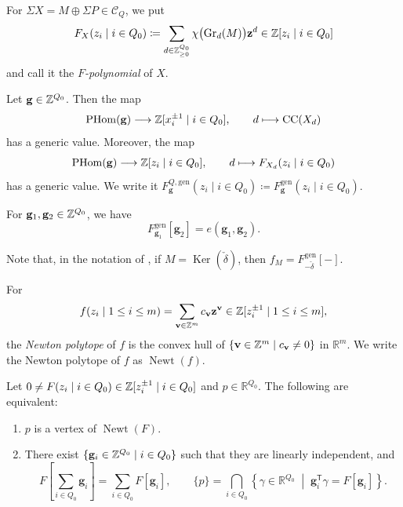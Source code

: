 For $\Sigma X = M \oplus \Sigma P \in \mathcal{C}_Q$, we put
\[
F_X(z_i \mid i \in Q_0)
\coloneq
\sum_{d \in \mathbb{Z}_{\geq 0}^{Q_0}}
\chi\bigl(\operatorname{Gr}_d(M)\bigr)\mathbf{z}^d
\in \mathbb{Z}[z_i \mid i \in Q_0]
\]
and call it the \emph{$F$-polynomial} of $X$.

\begin{Prop}
\label{Prop : generic cluster characters and F polynomials}
Let $\mathbf{g} \in \mathbb{Z}^{Q_0}$.
Then the map
\[
\operatorname{PHom}(\mathbf{g})
\longrightarrow \mathbb{Z}[x_i^{\pm 1} \mid i \in Q_0],
\qquad d \longmapsto \mathrm{CC}(X_d)
\]
has a generic value.
Moreover, the map
\[
\operatorname{PHom}(\mathbf{g})
\longrightarrow \mathbb{Z}[z_i \mid i \in Q_0],
\qquad d \longmapsto F_{X_d}(z_i \mid i \in Q_0)
\]
has a generic value.
We write it
$F_{\mathbf{g}}^{Q,\mathrm{gen}}(z_i \mid i \in Q_0)
\coloneq F_{\mathbf{g}}^{\mathrm{gen}}(z_i \mid i \in Q_0)$.
\end{Prop}

\begin{Prop}
\label{Prop : generic tropical F polynomials and E invariants}
For $\mathbf{g}_1, \mathbf{g}_2 \in \mathbb{Z}^{Q_0}$, we have
\[
F_{\mathbf{g}_1}^{\mathrm{gen}}[\mathbf{g}_2] = e(\mathbf{g}_1, \mathbf{g}_2).
\]
\end{Prop}

\begin{Rem}
\label{Rem : comparison with Fei notation}
Note that, in the notation of \cite{Fei23},
if $M = \operatorname{Ker}(\check{\delta})$, then
$f_M = F_{-\check{\delta}}^{\mathrm{gen}}[-]$.
\end{Rem}

\begin{Def}
\label{Def : Newton polytope}
For
\[
f(z_i \mid 1 \leq i \leq m)
= \sum_{\mathbf{v} \in \mathbb{Z}^m}c_{\mathbf{v}}\mathbf{z}^{\mathbf{v}}
\in \mathbb{Z}[z_i^{\pm 1} \mid 1 \leq i \leq m],
\]
the \emph{Newton polytope} of $f$ is the convex hull of
$\{\mathbf{v} \in \mathbb{Z}^m \mid c_{\mathbf{v}} \neq 0\}$ in $\mathbb{R}^m$.
We write the Newton polytope of $f$ as $\operatorname{Newt}(f)$.
\end{Def}

\begin{Lem}
\label{Lem : vertices of Newton polytopes}
Let $0 \neq F(z_i \mid i \in Q_0)
\in \mathbb{Z}[z_i^{\pm 1} \mid i \in Q_0]$
and $p \in \mathbb{R}^{Q_0}$.
The following are equivalent:
\begin{enumerate}
    \item[(i)]
    $p$ is a vertex of $\operatorname{Newt}(F)$.
    \item[(ii)]
    There exist $\{\mathbf{g}_i \in \mathbb{Z}^{Q_0} \mid i \in Q_0\}$ such that
    they are linearly independent, and
    \[
    F\left[\sum_{i \in Q_0}\mathbf{g}_i\right]
    = \sum_{i \in Q_0}F[\mathbf{g}_i],
    \qquad
    \{p\}
    = \bigcap_{i \in Q_0}
    \left\{\gamma \in \mathbb{R}^{Q_0}
    \;\middle|\; \mathbf{g}_i^{\mathsf{T}}\gamma = F[\mathbf{g}_i]\right\}.
    \]
\end{enumerate}
\end{Lem}

